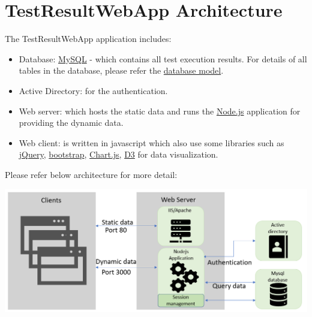 



\hypertarget{webapp-architecture}{%
\section{TestResultWebApp Architecture}\label{webapp-architecture}}

The TestResultWebApp application includes:
\begin{itemize}
   \item Database: \href{https://mysql.com/}{MySQL} - which contains all test execution 
         results. For details of all tables in the database, please refer the 
         \href{https://github.com/test-fullautomation/testresultwebapp/blob/develop/TestResultWebApp/mysql_server/datamodel/datamodel.svg}{database
         model}.
   \item Active Directory: for the authentication.
   \item Web server: which hosts the static data and runs the \href{https://nodejs.org/}{Node.js}
         application for providing the dynamic data.
   \item Web client: is written in javascript which also use some libraries such 
         as \href{https://jquery.com/}{jQuery}, \href{https://getbootstrap.com/docs/5.0/getting-started/introduction/}{bootstrap},
         \href{https://www.chartjs.org/}{Chart.js}, 
         \href{https://d3js.org/}{D3} for data visualization. 
\end{itemize}

Please refer below architecture for more detail:

\includegraphics[width=1\linewidth]{./pictures/Architechture.png}

